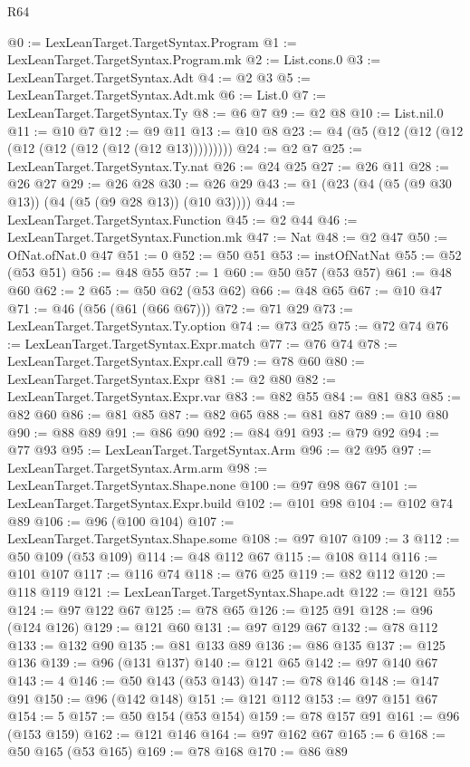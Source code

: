 \begin{lexlean}{R64}
\begin{coremodule}
@0 := LexLeanTarget.TargetSyntax.Program
@1 := LexLeanTarget.TargetSyntax.Program.mk
@2 := List.cons.{0}
@3 := LexLeanTarget.TargetSyntax.Adt
@4 := @2 @3
@5 := LexLeanTarget.TargetSyntax.Adt.mk
@6 := List.{0}
@7 := LexLeanTarget.TargetSyntax.Ty
@8 := @6 @7
@9 := @2 @8
@10 := List.nil.{0}
@11 := @10 @7
@12 := @9 @11
@13 := @10 @8
@23 := @4 (@5 (@12 (@12 (@12 (@12 (@12 (@12 (@12 (@12 @13)))))))))
@24 := @2 @7
@25 := LexLeanTarget.TargetSyntax.Ty.nat
@26 := @24 @25
@27 := @26 @11
@28 := @26 @27
@29 := @26 @28
@30 := @26 @29
@43 := @1 (@23 (@4 (@5 (@9 @30 @13)) (@4 (@5 (@9 @28 @13)) (@10 @3))))
@44 := LexLeanTarget.TargetSyntax.Function
@45 := @2 @44
@46 := LexLeanTarget.TargetSyntax.Function.mk
@47 := Nat
@48 := @2 @47
@50 := OfNat.ofNat.{0} @47
@51 := 0
@52 := @50 @51
@53 := instOfNatNat
@55 := @52 (@53 @51)
@56 := @48 @55
@57 := 1
@60 := @50 @57 (@53 @57)
@61 := @48 @60
@62 := 2
@65 := @50 @62 (@53 @62)
@66 := @48 @65
@67 := @10 @47
@71 := @46 (@56 (@61 (@66 @67)))
@72 := @71 @29
@73 := LexLeanTarget.TargetSyntax.Ty.option
@74 := @73 @25
@75 := @72 @74
@76 := LexLeanTarget.TargetSyntax.Expr.match
@77 := @76 @74
@78 := LexLeanTarget.TargetSyntax.Expr.call
@79 := @78 @60
@80 := LexLeanTarget.TargetSyntax.Expr
@81 := @2 @80
@82 := LexLeanTarget.TargetSyntax.Expr.var
@83 := @82 @55
@84 := @81 @83
@85 := @82 @60
@86 := @81 @85
@87 := @82 @65
@88 := @81 @87
@89 := @10 @80
@90 := @88 @89
@91 := @86 @90
@92 := @84 @91
@93 := @79 @92
@94 := @77 @93
@95 := LexLeanTarget.TargetSyntax.Arm
@96 := @2 @95
@97 := LexLeanTarget.TargetSyntax.Arm.arm
@98 := LexLeanTarget.TargetSyntax.Shape.none
@100 := @97 @98 @67
@101 := LexLeanTarget.TargetSyntax.Expr.build
@102 := @101 @98
@104 := @102 @74 @89
@106 := @96 (@100 @104)
@107 := LexLeanTarget.TargetSyntax.Shape.some
@108 := @97 @107
@109 := 3
@112 := @50 @109 (@53 @109)
@114 := @48 @112 @67
@115 := @108 @114
@116 := @101 @107
@117 := @116 @74
@118 := @76 @25
@119 := @82 @112
@120 := @118 @119
@121 := LexLeanTarget.TargetSyntax.Shape.adt
@122 := @121 @55
@124 := @97 @122 @67
@125 := @78 @65
@126 := @125 @91
@128 := @96 (@124 @126)
@129 := @121 @60
@131 := @97 @129 @67
@132 := @78 @112
@133 := @132 @90
@135 := @81 @133 @89
@136 := @86 @135
@137 := @125 @136
@139 := @96 (@131 @137)
@140 := @121 @65
@142 := @97 @140 @67
@143 := 4
@146 := @50 @143 (@53 @143)
@147 := @78 @146
@148 := @147 @91
@150 := @96 (@142 @148)
@151 := @121 @112
@153 := @97 @151 @67
@154 := 5
@157 := @50 @154 (@53 @154)
@159 := @78 @157 @91
@161 := @96 (@153 @159)
@162 := @121 @146
@164 := @97 @162 @67
@165 := 6
@168 := @50 @165 (@53 @165)
@169 := @78 @168
@170 := @86 @89

\end{coremodule}
\end{lexlean}
